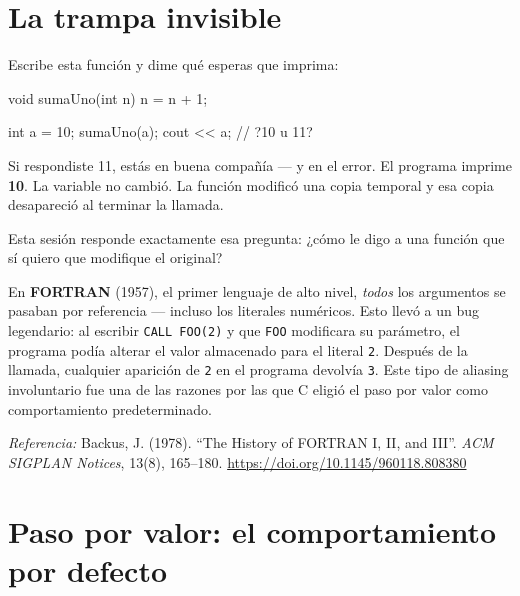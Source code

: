\documentclass[12pt, oneside]{article}
\begin{document}

\tableofcontents
\newpage

\section{La trampa invisible}

Escribe esta función y dime qué esperas que imprima:

\begin{codigo}
void sumaUno(int n) {
    n = n + 1;
}

int a = 10;
sumaUno(a);
cout << a;   // ?10 u 11?
\end{codigo}

Si respondiste 11, estás en buena compañía — y en el error. El programa imprime \textbf{10}.
La variable  no cambió. La función modificó una copia temporal y esa copia desapareció
al terminar la llamada.

Esta sesión responde exactamente esa pregunta: ¿cómo le digo a una función que sí quiero
que modifique el original?

\begin{tecnico}
  En \textbf{FORTRAN} (1957), el primer lenguaje de alto nivel, \textit{todos} los argumentos
  se pasaban por referencia — incluso los literales numéricos. Esto llevó a un bug legendario:
  al escribir \texttt{CALL FOO(2)} y que \texttt{FOO} modificara su parámetro, el programa
  podía alterar el valor almacenado para el literal \texttt{2}. Después de la llamada,
  cualquier aparición de \texttt{2} en el programa devolvía \texttt{3}.
  Este tipo de aliasing involuntario fue una de las razones por las que C eligió el paso
  por valor como comportamiento predeterminado.
  \par\smallskip
  \textit{Referencia:} Backus, J. (1978). ``The History of FORTRAN I, II, and III''.
  \textit{ACM SIGPLAN Notices}, 13(8), 165--180.
  \url{https://doi.org/10.1145/960118.808380}
\end{tecnico}

\section{Paso por valor: el comportamiento por defecto}
\end{document}
